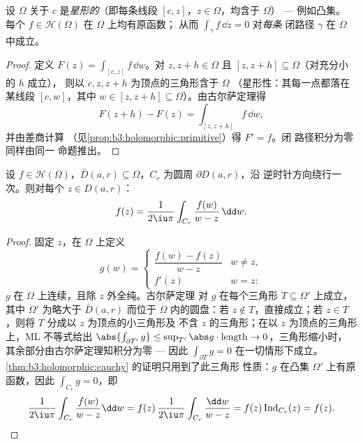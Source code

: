 \begin{theorem}
\label{thm:b3:holomorphic:cauchy}
设 $\Omega$ 关于 $c$ 是\emph{星形的}（即每条线段
$[c, z]$，$z \in \Omega$，均含于 $\Omega$） --- 例如凸集。
每个 $f \in \mathcal H(\Omega)$ 在 $\Omega$ 上均有原函数；
从而 $\int_\gamma f\,\dd z = 0$ 对\emph{每条}
闭路径 $\gamma$ 在 $\Omega$ 中成立。
\end{theorem}

\begin{proof}
定义 $F(z) = \int_{[c,z]}f\,\dd w$。对 $z, z + h \in
\Omega$ 且 $[z, z+h] \subseteq \Omega$（对充分小的 $h$ 成立），
则以 $c, z, z+h$ 为顶点的三角形含于 $\Omega$
（星形性：其每一点都落在某线段 $[c,
w]$，其中 $w \in [z, z+h] \subseteq \Omega$）。由古尔萨定理得
\[
F(z + h) - F(z) = \int_{[z, z+h]}f\,\dd w,
\]
并由差商计算
（见\cref{prop:b3:holomorphic:primitive}）得 $F' = f$。闭
路径积分为零同样由同一
命题推出。
\end{proof}

\begin{theorem}[柯西积分公式]
\label{thm:b3:holomorphic:formula}
设 $f \in \mathcal H(\Omega)$，$\bar D(a, r) \subseteq
\Omega$，$C_r$ 为圆周 $\partial D(a,r)$，沿
逆时针方向绕行一次。则对每个 $z \in D(a, r)$：
\[
f(z) = \frac1{2\iu\pi}\int_{C_r}\frac{f(w)}{w - z}\,\dd w .
\]
\end{theorem}

\begin{proof}
固定 $z$，在 $\Omega$ 上定义
\[
g(w) = \begin{cases}
\dfrac{f(w) - f(z)}{w - z} & w \neq z,\\[4pt]
f'(z) & w = z :
\end{cases}
\]
$g$ 在 $\Omega$ 上连续，且除 $z$ 外全纯。古尔萨定理
对 $g$ 在每个三角形 $T \subseteq \Omega'$ 上成立，其中
$\Omega'$ 为略大于 $\bar D(a,r)$ 而位于
$\Omega$ 内的圆盘：若 $z \notin T$，直接成立；若 $z \in T$，则将 $T$
分成以 $z$ 为顶点的小三角形及
不含 $z$ 的三角形；在以 $z$ 为顶点的三角形上，ML 不等式给出
$\abs{\int_{\partial T'}g} \leq \sup_{T'}\abs
g\cdot\operatorname{length} \to 0$，三角形缩小时，
其余部分由古尔萨定理知积分为零 --- 因此
$\int_{\partial T}g = 0$ 在一切情形下成立。
\cref{thm:b3:holomorphic:cauchy} 的证明只用到了此三角形
性质：$g$ 在凸集 $\Omega'$ 上有原函数，因此
$\int_{C_r}g = 0$，即
\[
\frac1{2\iu\pi}\int_{C_r}\frac{f(w)}{w - z}\dd w
= f(z)\,\frac{1}{2\iu\pi}\int_{C_r}\frac{\dd w}{w - z}
= f(z)\operatorname{Ind}_{C_r}(z) = f(z) .
\]
\end{proof}

